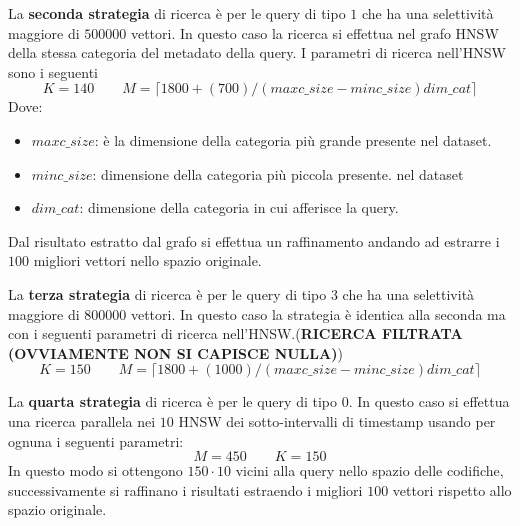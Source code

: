 La \textbf{seconda strategia} di ricerca è per le query di tipo $1$ che ha una selettività 
maggiore di $500000$ vettori. In questo caso la ricerca si effettua nel grafo 
HNSW della stessa categoria del metadato della query. I parametri di ricerca nell'HNSW
sono i seguenti 
$$K = 140 \qquad M= \lceil1800+(700)/(maxc\_size - minc\_size)dim\_cat\rceil$$
Dove:
\begin{itemize}
    \item $maxc\_size$: è la dimensione della categoria più grande presente 
    nel dataset.
    \item $minc\_size$: dimensione della categoria più piccola presente.
    nel dataset
    \item $dim\_cat$: dimensione della categoria in cui afferisce la query.
\end{itemize}
Dal risultato estratto dal grafo si effettua un raffinamento andando ad estrarre 
i $100$ migliori vettori nello spazio originale.

La \textbf{terza strategia} di ricerca è per le query di tipo $3$ che ha una selettività 
maggiore di $800000$ vettori. In questo caso la strategia è identica alla seconda 
ma con i seguenti parametri di ricerca nell'HNSW.(\textbf{RICERCA FILTRATA (OVVIAMENTE NON SI CAPISCE NULLA)}) 
$$K = 150 \qquad M= \lceil1800+(1000)/(maxc\_size - minc\_size)dim\_cat\rceil$$

La \textbf{quarta strategia} di ricerca è per le query di tipo $0$. In questo caso 
si effettua una ricerca parallela nei $10$ HNSW dei sotto-intervalli di timestamp 
usando per ognuna i seguenti parametri:
$$M=450 \qquad K=150$$
In questo modo si ottengono $150\cdot 10$ vicini alla query nello spazio delle 
codifiche, successivamente si raffinano i risultati estraendo i migliori $100$ 
vettori rispetto allo spazio originale.

